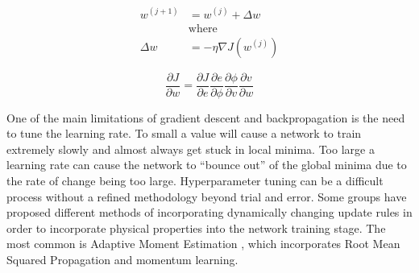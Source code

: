 \begin{equation}
    \begin{aligned}
        w^{(j+1)} &= w^{(j)} + \Delta w\\
        &\text{where} \\
        \Delta w &= -\eta \nabla J(w^{(j)})
    \end{aligned}
    \label{eq:grad-descent}
\end{equation}

\begin{equation}
    \frac{\partial J}{\partial w} = \frac{\partial J}{\partial e}\frac{\partial e}{\partial \phi}\frac{\partial \phi}{\partial v} \frac{\partial v}{\partial w}
    \label{eq:chain-rule}
\end{equation}

One of the main limitations of gradient descent and backpropagation is the need to tune the learning rate. To small a value will cause a network to train extremely slowly and almost always get stuck in local minima. Too large a learning rate can cause the network to ``bounce out'' of the global minima due to the rate of change being too large. Hyperparameter tuning can be a difficult process without a refined methodology beyond trial and error. Some groups have proposed different methods of incorporating dynamically changing update rules in order to incorporate physical properties into the network training stage. The most common is Adaptive Moment Estimation \cite{kingmaAdamMethodStochastic2017}, which incorporates Root Mean Squared Propagation \cite{hinton2012neural} and momentum learning.

